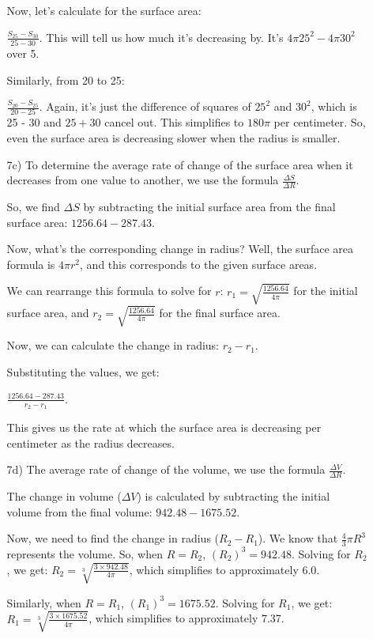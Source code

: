 \documentclass{article}
\begin{document}
\begin{itemize}
\begin{enumerate}
Now, let's calculate for the surface area:

\(\frac{{S_{25} - S_{30}}}{{25 - 30}}\). This will tell us how much it's decreasing by. It's \(4 \pi 25^2 - 4 \pi 30^2\) over 5. 

Similarly, from 20 to 25:

\(\frac{{S_{20} - S_{25}}}{{20 - 25}}\). Again, it's just the difference of squares of \(25^2\) and \(30^2\), which is 25 - 30 and \(25 + 30\) cancel out. This simplifies to \(180 \pi\) per centimeter. So, even the surface area is decreasing slower when the radius is smaller.
 \item[7c)]To determine the average rate of change of the surface area when it decreases from one value to another, we use the formula \(\frac{\Delta S}{\Delta R}\). 

So, we find \(\Delta S\) by subtracting the initial surface area from the final surface area: \(1256.64 - 287.43\). 

Now, what's the corresponding change in radius? Well, the surface area formula is \(4 \pi r^2\), and this corresponds to the given surface areas. 

We can rearrange this formula to solve for \(r\): \(r_1 = \sqrt{\frac{1256.64}{4 \pi}}\) for the initial surface area, and \(r_2 = \sqrt{\frac{1256.64}{4 \pi}}\) for the final surface area.

Now, we can calculate the change in radius: \(r_2 - r_1\). 

Substituting the values, we get: 

\(\frac{1256.64 - 287.43}{r_2 - r_1}\). 

This gives us the rate at which the surface area is decreasing per centimeter as the radius decreases.
 \item[7d)]The average rate of change of the volume, we use the formula \(\frac{\Delta V}{\Delta R}\). 

The change in volume (\(\Delta V\)) is calculated by subtracting the initial volume from the final volume: \(942.48 - 1675.52\). 

Now, we need to find the change in radius (\(R_2 - R_1\)). We know that \(\frac{4}{3}\pi R^3\) represents the volume. So, when \(R = R_2\), \((R_2)^3 = 942.48\). Solving for \(R_2\), we get: \(R_2 = \sqrt[3]{\frac{3 \times 942.48}{4 \pi}}\), which simplifies to approximately 6.0.

Similarly, when \(R = R_1\), \((R_1)^3 = 1675.52\). Solving for \(R_1\), we get: \(R_1 = \sqrt[3]{\frac{3 \times 1675.52}{4 \pi}}\), which simplifies to approximately 7.37.


\end{enumerate}
\end{itemize}
\end{document}
